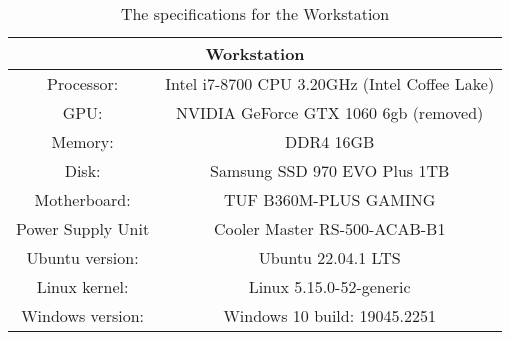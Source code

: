\begin{table}[H]
    \centering
    \begin{tabular}{|| c | c ||}
    \hline
    \multicolumn{2}{||c||}{Workstation}           \\ [0.5ex] \hline\hline
    Processor:   & Intel i7-8700 CPU 3.20GHz (Intel Coffee Lake)\\
    GPU:         & NVIDIA GeForce GTX 1060 6gb (removed) \\
    Memory:      & DDR4 16GB                     \\
    Disk:        & Samsung SSD 970 EVO Plus 1TB \\
    Motherboard: & TUF B360M-PLUS GAMING       \\
    Power Supply Unit & Cooler Master RS-500-ACAB-B1 \\
    Ubuntu version:  & Ubuntu 22.04.1 LTS        \\
    Linux kernel: & Linux 5.15.0-52-generic       \\
    Windows version:& Windows 10 build: 19045.2251 \\ \hline
    \end{tabular}
    \caption{The specifications for the Workstation}
    \label{tab:komplett}
\end{table}